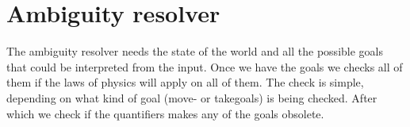 
\section*{Ambiguity resolver}
The ambiguity resolver needs the state of the world and all the possible goals that could be interpreted from the input.
Once we have the goals we checks all of them if the laws of physics will apply on all of them.
The check is simple, depending on what kind of goal (move- or takegoals) is being checked.
After which we check if the quantifiers makes any of the goals obsolete. %


